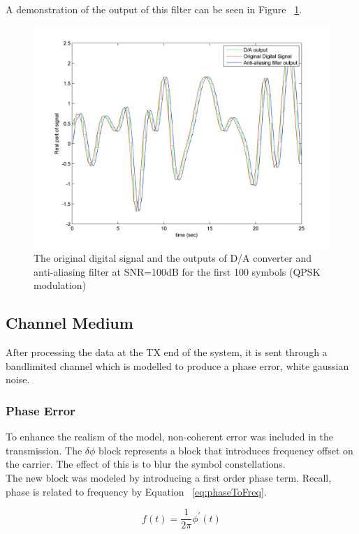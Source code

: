 \documentclass[]{article}
\begin{document}
A demonstration of the output of this filter can be seen in Figure ~\ref{fig:dtoa}.

	\begin{figure}[H]
	\centering
	\includegraphics[width=\textwidth]	{DtoA.jpg}
	\caption{The original digital signal and the outputs of D/A converter and anti-aliasing filter at SNR=100dB for the first 100 symbols (QPSK modulation)\label{fig:dtoa}}
	\end{figure}

\subsection{Channel Medium}
After processing the data at the TX end of the system, it is sent through a bandlimited channel which is modelled to produce a phase error, white gaussian noise. 

\label{sec:channel}
\subsubsection{Phase Error}
\label{sec:phaseError}
To enhance the realism of the model, non-coherent error was included in the transmission. The $\delta\phi$ block represents a block that introduces frequency offset on the carrier.  The effect of this is to blur the symbol constellations.  \\

The new block was modeled by introducing a first order phase term.  Recall, phase is related to frequency by Equation ~\ref{eq:phaseToFreq}.

\begin{equation}
\label{eq:phaseToFreq}
f(t) = \frac{1}{2 \pi} \phi^\prime(t)
\end{equation}
\end{document}
